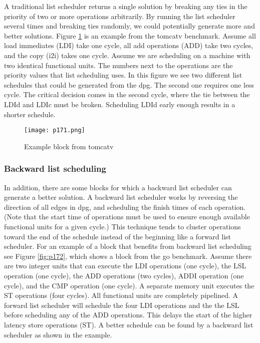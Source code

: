 A traditional list scheduler returns a single solution by breaking any ties in the priority of two or more
operations arbitrarily. By running the list scheduler several times and breaking ties randomly, we could
potentially generate more and better solutions. Figure \ref{fig:p171} is an example from the tomcatv benchmark. Assume
all load immediates (LDI) take one cycle, all add operations (ADD) take two cycles, and the copy (i2i) takes
one cycle. Assume we are scheduling on a machine with two identical functional units. The numbers next
to the operations are the priority values that list scheduling uses. In this figure we see two different list
schedules that could be generated from the dpg. The second one requires one less cycle. The critical decision
comes in the second cycle, where the tie between the LDId and LDIc must be broken. Scheduling LDId early
enough results in a shorter schedule.

\begin{figure}[H]
	\centering
	\texttt{[image: p171.png]}
	\caption{Example block from tomcatv}
	\label{fig:p171}
\end{figure}

\subsubsection{Backward list scheduling}
In addition, there are some blocks for which a backward list scheduler can generate a better solution. A
backward list scheduler works by reversing the direction of all edges in dpg, and scheduling the finish times
of each operation. (Note that the start time of operations must be used to ensure enough available functional
units for a given cycle.) This technique tends to cluster operations toward the end of the schedule instead
of the beginning like a forward list scheduler. For an example of a block that benefits from backward list
scheduling see Figure \ref{fig:p172}, which shows a block from the go benchmark. Assume there are two integer units
that can execute the LDI operations (one cycle), the LSL operation (one cycle), the ADD operations (two
cycles), ADDI operation (one cycle), and the CMP operation (one cycle). A separate memory unit executes
the ST operations (four cycles). All functional units are completely pipelined. A forward list scheduler will
schedule the four LDI operations and the the LSL before scheduling any of the ADD operations. This delays
the start of the higher latency store operations (ST). A better schedule can be found by a backward list
scheduler as shown in the example.

